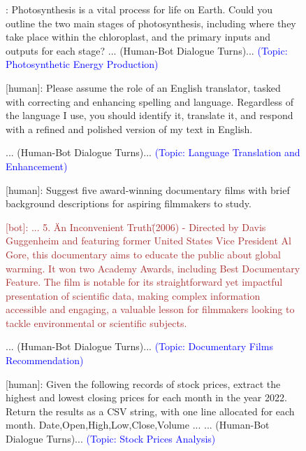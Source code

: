 \begin{figure}[htb]
\small
\begin{tcolorbox}[left=3pt,right=3pt,top=3pt,bottom=3pt,title=\textbf{Conversation History:}]
[human]: Photosynthesis is a vital process for life on Earth. Could you outline the two main stages of photosynthesis, including where they take place within the chloroplast, and the primary inputs and outputs for each stage? ... (Human-Bot Dialogue Turns)... \textcolor{blue}{(Topic: Photosynthetic Energy Production)}

[human]: Please assume the role of an English translator, tasked with correcting and enhancing spelling and language. Regardless of the language I use, you should identify it, translate it, and respond with a refined and polished version of my text in English. 

... (Human-Bot Dialogue Turns)...  \textcolor{blue}{(Topic: Language Translation and Enhancement)}

[human]: Suggest five award-winning documentary films with brief background descriptions for aspiring filmmakers to study.

\textcolor{brown}{[bot]: ...
5. \"An Inconvenient Truth\" (2006) - Directed by Davis Guggenheim and featuring former United States Vice President Al Gore, this documentary aims to educate the public about global warming. It won two Academy Awards, including Best Documentary Feature. The film is notable for its straightforward yet impactful presentation of scientific data, making complex information accessible and engaging, a valuable lesson for filmmakers looking to tackle environmental or scientific subjects.}

... (Human-Bot Dialogue Turns)... 
\textcolor{blue}{(Topic: Documentary Films Recommendation)}

[human]: Given the following records of stock prices, extract the highest and lowest closing prices for each month in the year 2022. Return the results as a CSV string, with one line allocated for each month. Date,Open,High,Low,Close,Volume ... ... (Human-Bot Dialogue Turns)...  \textcolor{blue}{(Topic: Stock Prices Analysis)}


\end{tcolorbox}
\end{figure}

